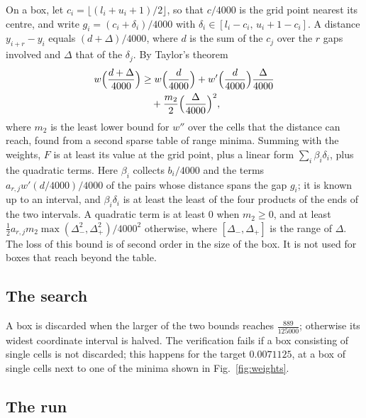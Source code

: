 \documentclass[aps,prd,twocolumn,superscriptaddress,nofootinbib,longbibliography,floatfix,showkeys,amsmath,amssymb,10pt]{revtex4-2}
\theoremstyle{definition}
\theoremstyle{remark}
\begin{document}
On a box, let $c_i=\lfloor(l_i+u_i+1)/2\rfloor$, so that $c/4000$ is the
grid point nearest its centre, and write $g_i=(c_i+\delta_i)/4000$ with
$\delta_i\in[l_i-c_i,\,u_i+1-c_i]$. A distance $y_{i+r}-y_i$ equals
$(d+\Delta)/4000$, where $d$ is the sum of the $c_j$ over the $r$ gaps
involved and $\Delta$ that of the $\delta_j$. By Taylor's theorem
\begin{align*}
 w\Bigl(\frac{d+\Delta}{4000}\Bigr)&\ge w\Bigl(\frac d{4000}\Bigr)
 +w'\Bigl(\frac d{4000}\Bigr)\frac\Delta{4000}\\
 &\quad+\frac{m_2}2\Bigl(\frac\Delta{4000}\Bigr)^2,
\end{align*}
where $m_2$ is the least lower bound for $w''$ over the cells that the
distance can reach, found from a second sparse table of range minima.
Summing with the weights, $F$ is at least its value at the grid point,
plus a linear form $\sum_i\beta_i\delta_i$, plus the quadratic terms. Here
$\beta_i$ collects $b_i/4000$ and the terms $a_{r,j}w'(d/4000)/4000$ of the
pairs whose distance spans the gap $g_i$; it is known up to an interval,
and $\beta_i\delta_i$ is at least the least of the four products of the
ends of the two intervals. A quadratic term is at least $0$ when
$m_2\ge0$, and at least $\frac12a_{r,j}m_2\max(\Delta_-^2,\Delta_+^2)/4000^2$
otherwise, where $[\Delta_-,\Delta_+]$ is the range of $\Delta$. The loss
of this bound is of second order in the size of the box. It is not used for
boxes that reach beyond the table.

\subsection{The search}

A box is discarded when the larger of the two bounds reaches
$\frac{889}{125000}$; otherwise its widest coordinate interval is halved.
The verification fails if a box consisting of single cells is not
discarded; this happens for the target $0.0071125$, at a box of single
cells next to one of the minima shown in Fig.~\ref{fig:weights}.

\subsection{The run}
\end{document}
